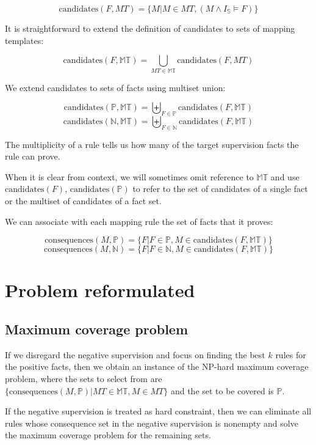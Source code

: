\documentclass{easychair}
\begin{document}
$$\mbox{candidates}(F, MT) = \{M | M \in MT, (M \land I_{\mathbb{S}} \vDash F)\}$$ 

It is straightforward to extend the definition of candidates to sets of mapping templates:

$$\mbox{candidates}(F, \mathbb{MT}) = \bigcup_{MT \in \mathbb{MT}} \mbox{candidates}(F, MT)$$

We extend candidates to sets of facts using multiset union:

$$\mbox{candidates}(\mathbb{P}, \mathbb{MT}) = \biguplus_{F \in \mathbb{P}} \mbox{candidates}(F, \mathbb{MT})$$
$$\mbox{candidates}(\mathbb{N}, \mathbb{MT}) = \biguplus_{F \in \mathbb{N}} \mbox{candidates}(F, \mathbb{MT})$$

The multiplicity of a rule tells us how many of the target supervision
facts the rule can prove.

When it is clear from context, we will sometimes omit reference to
$\mathbb{MT}$ and use $\mbox{candidates}(F)$,
$\mbox{candidates}(\mathbb{P})$ to refer to the set of candidates of a
single fact or the multiset of candidates of a fact set.

We can associate with each mapping rule the set of facts that it proves:

$$\mbox{consequences}(M, \mathbb{P}) = \{F | F \in \mathbb{P}, M \in \mbox{candidates}(F, \mathbb{MT}) \}$$
$$\mbox{consequences}(M, \mathbb{N}) = \{F | F \in \mathbb{N}, M \in \mbox{candidates}(F, \mathbb{MT}) \}$$

\section{Problem reformulated}

\subsection{Maximum coverage problem}

If we disregard the negative supervision and focus on finding the best
$k$ rules for the positive facts, then we obtain an instance of the
NP-hard maximum coverage problem, where the sets to select from are
$\{\mbox{consequences}(M, \mathbb{P}) | MT \in \mathbb{MT}, M \in MT
\}$ and the set to be covered is $\mathbb{P}$.

If the negative supervision is treated as hard constraint, then we can
eliminate all rules whose consequence set in the negative supervision is
nonempty and solve the maximum coverage problem for the remaining
sets.
\end{document}
